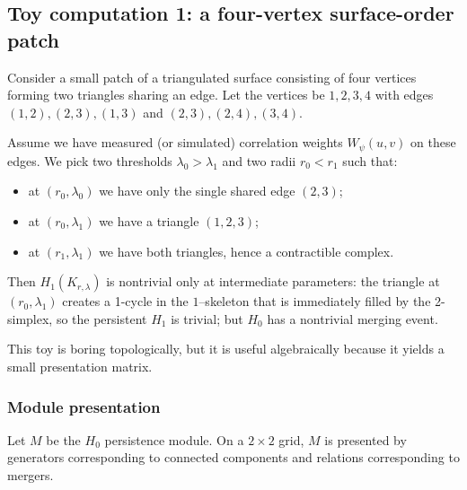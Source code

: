 \documentclass[11pt,oneside]{amsbook}
\numberwithin{equation}{section}
\theoremstyle{plain}
\theoremstyle{definition}
\theoremstyle{remark}
\begin{document}
\subsection{Toy computation 1: a four-vertex surface-order patch}
\label{sec:toy1}

Consider a small patch of a triangulated surface consisting of four vertices forming two triangles sharing an edge.
Let the vertices be $1,2,3,4$ with edges $(1,2),(2,3),(1,3)$ and $(2,3),(2,4),(3,4)$.

Assume we have measured (or simulated) correlation weights $W_\psi(u,v)$ on these edges.
We pick two thresholds $\lambda_0>\lambda_1$ and two radii $r_0<r_1$ such that:
\begin{itemize}
\item at $(r_0,\lambda_0)$ we have only the single shared edge $(2,3)$;
\item at $(r_0,\lambda_1)$ we have a triangle $(1,2,3)$;
\item at $(r_1,\lambda_1)$ we have both triangles, hence a contractible complex.
\end{itemize}

Then $H_1(K_{r,\lambda})$ is nontrivial only at intermediate parameters: the triangle at $(r_0,\lambda_1)$ creates a 1-cycle in the $1$--skeleton that is immediately filled by the 2-simplex, so the persistent $H_1$ is trivial; but $H_0$ has a nontrivial merging event.

This toy is boring topologically, but it is useful algebraically because it yields a small presentation matrix.

\subsubsection{Module presentation}
Let $M$ be the $H_0$ persistence module.
On a $2\times 2$ grid, $M$ is presented by generators corresponding to connected components and relations corresponding to mergers.
%
%
%
%
\end{document}
